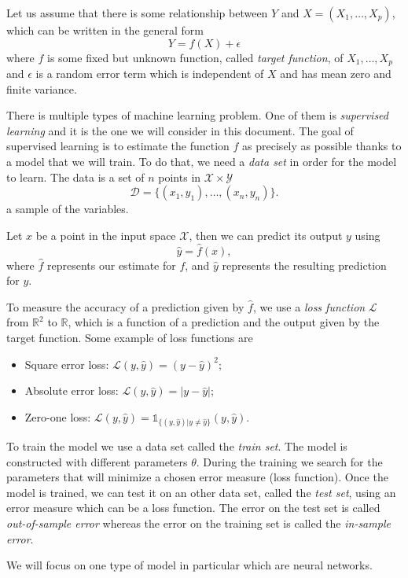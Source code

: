 \documentclass[10pt,a4paper]{article}
\theoremstyle{definition}
\theoremstyle{plain}
\begin{document}
Let us assume that there is some relationship between $Y$ and $X = (X_1,\dots, X_p)$, which can be written in the general form
$$
Y = f(X) + \epsilon
$$
where $f$ is some fixed but unknown function, called \textit{target function}, of $X_1, \dots, X_p$ and $\epsilon$ is a random error term which is independent of $X$ and has mean zero and finite variance.

There is multiple types of machine learning problem. One of them is \textit{supervised learning} and it is the one we will consider in this document. The goal of supervised learning is to estimate the function $f$ as precisely as possible thanks to a model that we will train. To do that, we need a \textit{data set} in order for the model to learn. The data is a set of $n$ points in $\mathcal{X} \times \mathcal{Y}$ 
$$
\mathcal{D} = \{(x_1, y_1),\dots, (x_n,y_n)\}.
$$
a sample of the variables.

Let $x$ be a point in the input space $\mathcal{X}$, then we can predict its output $y$ using 
$$
\hat{y} = \hat{f}(x),
$$
where $\hat{f}$ represents our estimate for $f$, and $\hat{y}$ represents the resulting prediction for $y$.

To measure the accuracy of a prediction given by $\hat{f}$, we use a \textit{loss function} $\mathcal{L}$ from  $\mathbb{R}^2$ to $\mathbb{R}$, which is a function of a prediction and the output given by the target function. Some example of loss functions are
\begin{itemize}
\item Square error loss: $\mathcal{L}(y, \hat{y}) = (y-\hat{y})^2$;
\item Absolute error loss: $\mathcal{L}(y, \hat{y}) = |y - \hat{y}|$;
\item Zero-one loss: $\mathcal{L}(y, \hat{y}) = \mathds{1}_{\{(y, \hat{y}) | y\neq \hat{y}\}}(y, \hat{y})$.
\end{itemize}

To train the model we use a data set called the \textit{train set}. The model is constructed with different parameters $\theta$. During the training we search for the parameters that will minimize a chosen error measure (loss function). Once the model is trained, we can test it on an other data set, called the \textit{test set}, using an error measure which can be a loss function. The error on the test set is called \textit{out-of-sample error} whereas the error on the training set is called the \textit{in-sample error}.

We will focus on one type of model in particular which are neural networks.
\end{document}
